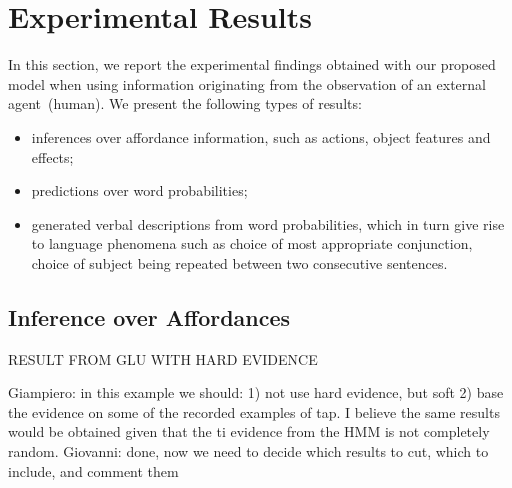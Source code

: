 
\section{Experimental Results}

In this section, we report the experimental findings obtained with our proposed model when using information originating from the observation of an external agent~(human).
We present the following types of results:
\begin{itemize}
  \item inferences over affordance information, such as actions, object features and effects;

  \item predictions over word probabilities;

  \item generated verbal descriptions from word probabilities, which in turn give rise to language phenomena such as choice of most appropriate conjunction, choice of subject being repeated between two consecutive sentences.
\end{itemize}

\subsection{Inference over Affordances}

RESULT FROM GLU WITH HARD EVIDENCE

{\color{red}
Giampiero: in this example we should: 1) not use hard evidence, but soft 2) base the evidence on some of the recorded examples of tap. I believe the same results would be obtained given that the ti evidence from the HMM is not completely random.
}
{\color{blue}
Giovanni: done, now we need to decide which results to cut, which to include, and comment them
}

